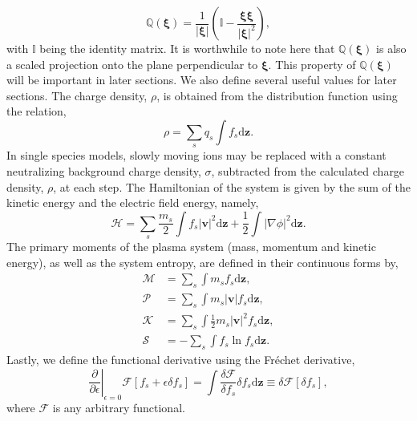 \documentclass[preprint,12pt]{elsarticle}
\theoremstyle{definition}
\begin{document}
\begin{equation}
  \mathbb{Q} (\boldsymbol{\xi}) = \frac{1}{|\boldsymbol{\xi}|} \left( \mathbb{I} - \frac{\boldsymbol{\xi} \boldsymbol{\xi}}{|\boldsymbol{\xi}|^2} \right),
\end{equation}
with $\mathbb{I}$ being the identity matrix. It is worthwhile to note here that $\mathbb{Q}(\boldsymbol{\xi})$ is also a scaled projection onto the plane perpendicular to $\boldsymbol{\xi}$. This property of $\mathbb{Q} (\boldsymbol{\xi})$ will be important in later sections. We also define several useful values for later sections. The charge density, $\rho$, is obtained from the distribution function using the relation,
\begin{equation}
    \rho = \sum_s q_s \int f_s  \mathrm{d} \mathbf{z}.\label{eq:chargedensity}
\end{equation}
In single species models, slowly moving ions may be replaced with a constant neutralizing background charge density, $\sigma$, subtracted from the calculated charge density, $\rho$, at each step. The Hamiltonian of the system is given by the sum of the kinetic energy and the electric field energy, namely,
\begin{equation}\label{eq:Hamiltonian}
  \mathcal{H} = \sum_s \frac{m_s}{2} \int f_s \left|\boldsymbol{v}\right|^2 \mathrm{d} \boldsymbol{z} + \frac{1}{2} \int \left| \nabla \phi \right|^2 \mathrm{d} \boldsymbol{z}.
\end{equation}
The primary moments of the plasma system (mass, momentum and kinetic energy), as well as the system entropy, are defined in their continuous forms by,
\begin{align}
  \mathcal{M} &= \sum_s \int  m_s  f_s \mathrm{d} \boldsymbol{z}, \label{eq:MassFunc} \\
  \mathcal{P} &= \sum_s \int  m_s |\boldsymbol{v}| f_s \mathrm{d} \boldsymbol{z}, \label{eq:MomFunc} \\
  \mathcal{K} &= \sum_s \int \frac{1}{2} m_s |\boldsymbol{v}|^2 f_s \mathrm{d} \boldsymbol{z}, \label{eq:KinEnFunc} \\
  \mathcal{S} &= - \sum_s \int f_s \ln f_s \mathrm{d} \boldsymbol{z}. \label{eq:EntFunc}
\end{align}
Lastly, we define the functional derivative using the Fr\'echet derivative,
\begin{equation}
  \left.\frac{\partial}{\partial \epsilon}\right|_{\epsilon=0} \mathcal{F}\left[f_{s}+\epsilon \delta f_{s}\right]=\int \frac{\delta \mathcal{F}}{\delta f_{s}} \delta f_{s} \mathrm{d} \boldsymbol{z} \equiv \delta \mathcal{F}\left[\delta f_{s}\right],
  \label{FuncDer}
\end{equation}
where $\mathcal{F}$ is any arbitrary functional.
\end{document}
